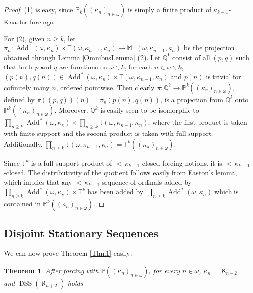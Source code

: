 \documentclass[12pt]{amsart}
\theoremstyle{definition}
\theoremstyle{remark}
\theoremstyle{plain}
\newtheorem{mysen}[mydef]{Theorem}
\numberwithin{mydef}{section}
\DeclareMathOperator{\Add}{Add}
\DeclareMathOperator{\DSS}{DSS}
\newcommand{\dM}{\mathbb{M}}
\newcommand{\dP}{\mathbb{P}}
\newcommand{\dQ}{\mathbb{Q}}
\newcommand{\dT}{\mathbb{T}}
\begin{document}
	\begin{proof}
		(1) is easy, since $\dP_k((\kappa_n)_{n\in\omega})$ is simply a finite product of $\kappa_{k-1}$-Knaster forcings.
		
		For (2), given $n\geq k$, let $\pi_n\colon\Add^*(\omega,\kappa_n)\times\dT(\omega,\kappa_{n-1},\kappa_n)\to\dM^+(\omega,\kappa_{n-1},\kappa_n)$ be the projection obtained through Lemma \ref{OmnibusLemma} (2). Let $\dQ^k$ consist of all $(p,q)$ such that both $p$ and $q$ are functions on $\omega\smallsetminus k$, for each $n\in\omega\smallsetminus k$, $(p(n),q(n))\in\Add^*(\omega,\kappa_n)\times\dT(\omega,\kappa_{n-1},\kappa_n)$ and $p(n)$ is trivial for cofinitely many $n$, ordered pointwise. Then clearly $\pi\colon\dQ^k\to\dP^k((\kappa_n)_{n\in\omega})$, defined by $\pi((p,q))(n)=\pi_n(p(n),q(n))$, is a projection from $\dQ^k$ onto $\dP^k((\kappa_n)_{n\in\omega})$. Moreover, $\dQ^k$ is easily seen to be isomorphic to $\prod_{n\geq k}\Add^*(\omega,\kappa_n)\times\prod_{n\geq k}\dT(\omega,\kappa_{n-1},\kappa_n)$, where the first product is taken with finite support and the second product is taken with full support. Additionally, $\prod_{n\geq k}\dT(\omega,\kappa_{n-1},\kappa_n)=\dT^k((\kappa_n)_{n\in\omega})$.
		
		Since $\dT^k$ is a full support product of ${<}\,\kappa_{k-1}$-closed forcing notions, it is ${<}\,\kappa_{k-1}$-closed. The distributivity of the quotient follows easily from Easton's lemma, which implies that any ${<}\,\kappa_{k-1}$-sequence of ordinals added by $\prod_{n\geq k}\Add^*(\omega,\kappa_n)\times\dT^k$ has been added by $\prod_{n\geq k}\Add^*(\omega,\kappa_n)$ which is contained in $\dP^k((\kappa_n)_{n\in\omega})$.
	\end{proof}
	
	\subsection{Disjoint Stationary Sequences}\hfill
	
	We can now prove Theorem \ref{Thm1} easily:
	
	\begin{mysen}
		After forcing with $\dP((\kappa_n)_{n\in\omega})$, for every $n\in\omega$, $\kappa_n=\aleph_{n+2}$ and $\DSS(\aleph_{n+2})$ holds.
	\end{mysen}
	
\end{document}
